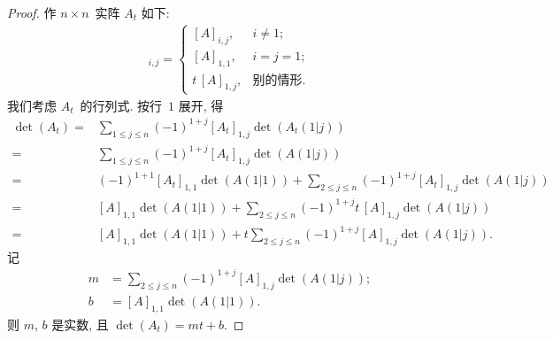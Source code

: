 \documentclass[../libro.tex]{subfiles}
\begin{document}
\begin{proof}
    作 \(n \times n\)~实阵 \(A_t\) 如下:
    \begin{align*}
        [A_t]_{i,j} =
        \begin{cases}
            [A]_{i,j},     & i \neq 1;    \\
            [A]_{1,1},     & i = j = 1;   \\
            t\, [A]_{1,j}, & \text{别的情形}.
        \end{cases}
    \end{align*}
    我们考虑 \(A_t\)~的行列式.
    按行~\(1\) 展开, 得
    \begin{align*}
        \det {(A_t)}
        = {} &
        \sum_{1 \leq j \leq n}
        {(-1)^{1 + j} [A_t]_{1,j} \det {(A_t (1 | j))}}
        \\
        = {} &
        \sum_{1 \leq j \leq n}
        {(-1)^{1 + j} [A_t]_{1,j} \det {(A (1 | j))}}
        \\
        = {} &
        (-1)^{1 + 1} [A_t]_{1,1} \det {(A (1 | 1))}
        +
        \sum_{2 \leq j \leq n}
        {(-1)^{1 + j} [A_t]_{1,j} \det {(A (1 | j))}}
        \\
        = {} &
        [A]_{1,1} \det {(A (1 | 1))}
        +
        \sum_{2 \leq j \leq n}
        {(-1)^{1 + j} t\, [A]_{1,j} \det {(A (1 | j))}}
        \\
        = {} &
        [A]_{1,1} \det {(A (1 | 1))}
        +
        t
        \sum_{2 \leq j \leq n}
        {(-1)^{1 + j} [A]_{1,j} \det {(A (1 | j))}}.
    \end{align*}
    记
    \begin{align*}
        m & =
        \sum_{2 \leq j \leq n}
        {(-1)^{1 + j} [A]_{1,j} \det {(A (1 | j))}};
        \\
        b & =
        [A]_{1,1} \det {(A (1 | 1))}.
    \end{align*}
    则 \(m\), \(b\) 是实数, 且
    \(\det {(A_t)} = mt + b\).


\end{proof}
\end{document}
